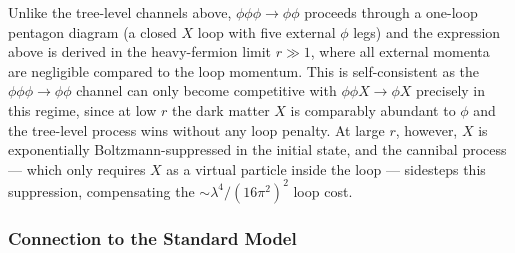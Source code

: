 \documentclass[11pt]{article}
\numberwithin{equation}{section}
\begin{document}
Unlike the tree-level channels above, $\phi\phi\phi\to\phi\phi$ proceeds through a one-loop pentagon diagram (a closed $X$ loop with five external $\phi$ legs) and the expression above is derived in the heavy-fermion limit $r \gg 1$, where all external momenta are negligible compared to the loop momentum. 
This is self-consistent as the $\phi\phi\phi\to\phi\phi$ channel can only become competitive with $\phi\phi X\to\phi X$ precisely in this regime, since at low $r$ the dark matter $X$ is comparably abundant to $\phi$ and the tree-level process wins without any loop penalty. At large $r$, however, $X$ is exponentially Boltzmann-suppressed in the initial state, and the cannibal process --- which only requires $X$ as a virtual particle inside the loop --- sidesteps this suppression, compensating the $\sim\!\lambda^4/(16\pi^2)^2$ loop cost.

\subsubsection{Connection to the Standard Model}
\label{sec:HP_SM}
\end{document}
